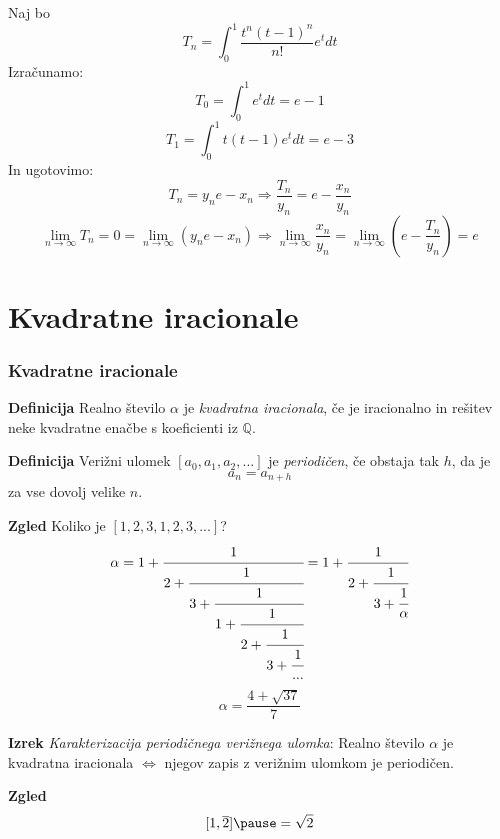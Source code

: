 \documentclass{beamer}
\newcommand{\Q}{\mathbb{Q}}
\newenvironment{df}{\begin{block}{\textbf{Definicija}}}{\end{block}}
\newenvironment{iz}{\begin{block}{\textbf{Izrek}}}{\end{block}}
\newenvironment{zg}{\begin{block}{\textbf{Zgled}}}{\end{block}}
\begin{document}
\begin{frame}
Naj bo $$T_n = \int_{0}^{1}\frac{t^n(t-1)^n}{n!}e^t dt$$   \pause
Izračunamo:
$$T_0 = \int_{0}^{1}e^t dt = e -1$$
$$T_1 = \int_{0}^{1}t(t-1)e^t dt=e-3$$    \pause
In ugotovimo:$$T_n=y_n e-x_n\Rightarrow \frac{T_n}{y_n}=e-\frac{x_n}{y_n}$$    \pause
$$\lim_{n\to\infty}T_n=0=\lim_{n\to\infty}(y_ne-x_n) \Rightarrow \lim_{n\to\infty}\frac{x_n}{y_n}=\lim_{n\to\infty}(e-\frac{T_n}{y_n}) =e$$
\end{frame}

\section{Kvadratne iracionale}

\begin{frame}
\frametitle{Kvadratne iracionale}
	\begin{df}
	Realno število $\alpha$ je \textit{kvadratna iracionala}, če je iracionalno in rešitev neke kvadratne enačbe s koeficienti iz $\Q$.
	\end{df}  \pause
	\begin{df}
	Verižni ulomek $[a_0, a_1, a_2, ...]$ je \textit{periodičen}, če obstaja tak $h$, da je $$a_n=a_{n+h}$$ za vse dovolj velike $n$.
	\end{df}
\end{frame}

\begin{frame}
	\begin{zg}
	Koliko je $[1, 2, 3, 1, 2, 3, ...]$? $$\alpha = 1+\cfrac{1}{2+\cfrac{1}{3+\cfrac{1}{1+\cfrac{1}{2+\cfrac{1}{3+\cfrac{1}{...}}}}}}=1+\cfrac{1}{2+\cfrac{1}{3+\cfrac{1}{\alpha}}}$$
	$$\alpha = \frac{4+\sqrt{37}}{7}$$
	\end{zg}
\end{frame}

\begin{frame}
	\begin{iz}
	\textit{Karakterizacija periodičnega verižnega ulomka}: Realno število $\alpha$ je kvadratna iracionala $\Leftrightarrow$ njegov zapis z verižnim ulomkom je periodičen.
	\end{iz}
	\begin{zg}
	$$[1,\overline{2}] \pause = \sqrt{2}$$
	\end{zg}
\end{frame}
\end{document}
